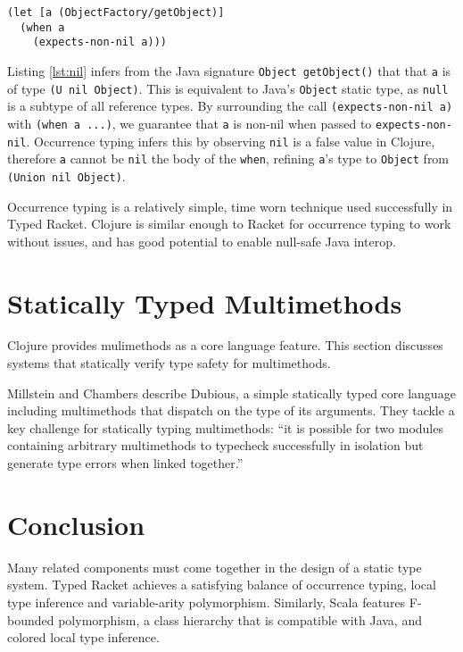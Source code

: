 \begin{lstlisting}[caption=Observing nil-checks using occurrence typing, label=lst:nil]
(let [a (ObjectFactory/getObject)]
  (when a
    (expects-non-nil a)))
\end{lstlisting}

Listing \ref{lst:nil} infers from the Java signature \lstinline|Object getObject()| that
that \lstinline|a| is of type \lstinline|(U nil Object)|. This is equivalent to Java's
\lstinline|Object| static type, as \lstinline|null| is a subtype of all reference types. By surrounding
the call \lstinline|(expects-non-nil a)| with \lstinline|(when a ...)|, we guarantee that
\lstinline|a| is non-nil when passed to \lstinline|expects-non-nil|. Occurrence typing infers
this by observing \lstinline|nil| is a false value in Clojure, therefore \lstinline|a| cannot
be \lstinline|nil| the body of the \lstinline|when|, refining \lstinline|a|'s type to \lstinline|Object|
from \lstinline|(Union nil Object)|.

Occurrence typing is a relatively simple, time worn technique used successfully 
in Typed Racket. Clojure is similar enough to Racket for occurrence typing to work
without issues, and has good potential to enable null-safe Java interop.

\section{Statically Typed Multimethods}

Clojure provides mulimethods as a core language feature. This section discusses systems that statically
verify type safety for multimethods.

Millstein and Chambers\cite{MS02}
describe Dubious, a simple statically typed core language including multimethods that
dispatch on the type of its arguments. They tackle a key challenge for statically typing
multimethods: ``it is possible for two modules containing arbitrary multimethods to typecheck
successfully in isolation but generate type errors when linked together.''\cite{MS02}

\section{Conclusion}

Many related components must come together in the design of a
static type system. Typed Racket achieves a satisfying balance of 
occurrence typing, local type inference and variable-arity polymorphism.
Similarly, Scala features F-bounded polymorphism, a class hierarchy
that is compatible with Java, and colored local type inference.

